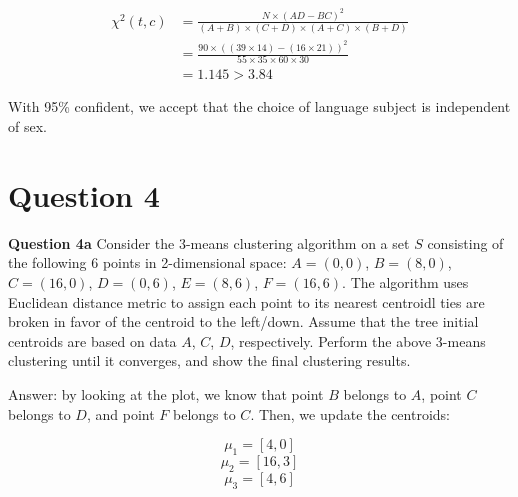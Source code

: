 \documentclass[11pt,a4paper]{report}
\begin{document}
\begin{multicols*}{2}
\begin{equation*}
\begin{split}
   \chi^2(t,c) &= \frac{N\times (AD - BC)^2}{(A+B) \times (C+D) \times (A+C) \times (B+D)} \\
   &= \frac{90\times ((39 \times 14) - (16 \times 21))^2}{55\times 35 \times 60 \times 30}\\
   &= 1.145 > 3.84
\end{split}
\end{equation*}

\noindent With 95\% confident, we accept that the choice of language subject is independent of sex. 

\section{Question 4}

\noindent \textbf{Question 4a} Consider the 3-means clustering algorithm on a set $S$ consisting of the following 6 points in 2-dimensional space: $A=(0,0)$, $B=(8,0)$, $C=(16,0)$, $D=(0,6)$, $E=(8,6)$, $F=(16,6)$. The algorithm uses Euclidean distance metric to assign each point to its nearest centroidl ties are broken in favor of the centroid to the left/down. Assume that the tree initial centroids are based on data $A$, $C$, $D$, respectively. Perform the above 3-means clustering until it converges, and show the final clustering results.


\noindent Answer: by looking at the plot, we know that point $B$ belongs to $A$, point $C$ belongs to $D$, and point $F$ belongs to $C$. Then, we update the centroids:

$$\mu_1 = [4,0]$$
$$\mu_2 = [16,3]$$
$$\mu_3 = [4,6]$$



\end{multicols*}
\end{document}
